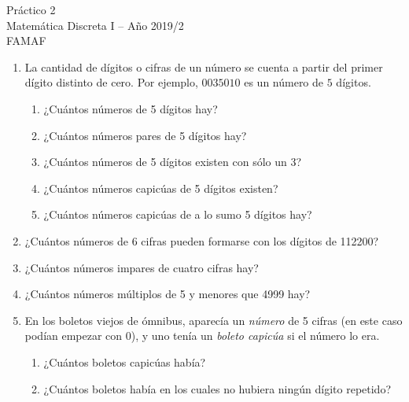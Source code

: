 \documentclass[12pt,spanish,makeidx]{amsbook}
\begin{document}
{\bf \begin{center} Práctico 2 \\ Matemática Discreta I -- Año 2019/2 \\ FAMAF \end{center}}

\smallskip

\begin {enumerate}


\item La cantidad de dígitos o cifras de un número se cuenta a partir del primer dígito distinto de cero. Por ejemplo, $0035010$ es un número de $5$ dígitos.
\begin{enumerate}
\item ¿Cuántos números de 5 dígitos hay?
\item ¿Cuántos números pares de 5 dígitos  hay?
\item ¿Cuántos números de 5 dígitos existen con sólo un 3?
\item ¿Cuántos números capicúas de 5 dígitos existen?
\item ¿Cuántos números capicúas de a lo sumo 5 dígitos hay?
\end{enumerate}

\smallskip

\item ¿Cuántos números de 6 cifras pueden formarse con los dígitos de 112200?

\smallskip

\item ¿Cuántos números impares de cuatro cifras hay?

\smallskip

\item ¿Cuántos números múltiplos de  5 y menores que 4999 hay?

\smallskip

\item En los boletos viejos de ómnibus, aparecía un {\em número} de 5 cifras (en este caso podían empezar con 0), y uno tenía un {\it boleto capicúa} si el número lo era.
\begin{enumerate}
\item ¿Cuántos boletos capicúas había?
\item ¿Cuántos boletos había en los cuales no hubiera ningún dígito repetido?
\end{enumerate}


\end{enumerate}
\end{document}
